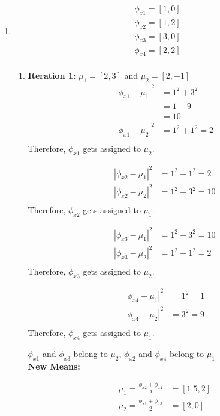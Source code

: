 \documentclass[12pt]{article}
\begin{document}
\begin{enumerate}[label=(\alph*)]
\item 
\begin{align*}
\phi_{x1} = [1,0] \\
\phi_{x2} = [1,2] \\
\phi_{x3} = [3,0] \\
\phi_{x4} = [2,2] \\
\end{align*}
	\begin{enumerate}[label=(\arabic*)]
	\item
	\textbf{Iteration 1:}
	$\mu_1 = [2,3]$ and $\mu_2 = [2,-1]$ \\
	\begin{align*}
	|\phi_{x1} - \mu_1|^2 &= 1^2 + 3^2 \\
	&= 1 + 9 \\
	&= 10 \\
	|\phi_{x1} - \mu_2|^2 &= 1^2 + 1^2 = 2 \\
	\end{align*}
	Therefore, $\phi_{x1}$ gets assigned to $\mu_2$.
	
	\begin{align*}
	|\phi_{x2} - \mu_1|^2 &= 1^2 + 1^2 = 2 \\
	|\phi_{x2} - \mu_2|^2 &= 1^2 + 3^2 = 10 \\
	\end{align*}
	Therefore, $\phi_{x2}$ gets assigned to $\mu_1$.
	
	\begin{align*}
	|\phi_{x3} - \mu_1|^2 &= 1^2 + 3^2 = 10 \\
	|\phi_{x3} - \mu_2|^2 &= 1^2 + 1^2 = 2 \\
	\end{align*}
	Therefore, $\phi_{x3}$ gets assigned to $\mu_2$.
	
	\begin{align*}
	|\phi_{x4} - \mu_1|^2 &= 1^2 = 1 \\
	|\phi_{x4} - \mu_2|^2 &= 3^2 = 9 \\
	\end{align*}
	Therefore, $\phi_{x4}$ gets assigned to $\mu_1$.
	
	$\phi_{x1}$ and $\phi_{x3}$ belong to $\mu_2$, $\phi_{x2}$ and $\phi_{x4}$ belong to $\mu_1$\\
	\textbf{New Means:}
	
	\begin{align*}
	\mu_1 = \frac{\phi_{x2} + \phi_{x4} }{2} &= [1.5, 2] \\
	\mu_2 = \frac{\phi_{x1} + \phi_{x3} }{2} &= [2, 0]
	\end{align*}
	

\end{enumerate}
\end{enumerate}
\end{document}
